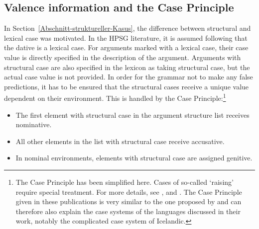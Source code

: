 \subsection{Valence information and the Case Principle}

\addlines[2]
In Section~\ref{Abschnitt-struktureller-Kasus}, the difference between structural
and lexical case was motivated. In the HPSG literature, it is assumed following \citet{Haider86}
that the dative is a lexical case. For arguments marked with a lexical case, their case value is
directly specified in the description of the argument. Arguments with structural case are also
specified in the lexicon as taking structural case, but the actual case value is not provided. In
order for the grammar not to make any false predictions, it has to be ensured that the structural
cases receive a unique value dependent on their 
environment. This is handled by the Case Principle:\footnote{%
	The Case Principle has been simplified here. Cases of so-called `raising' require special treatment.
	For more details, see ,  and . The Case Principle given in these publications is very similar to the one proposed by \citet*{YMJ87}
	and can therefore also explain the case systems of the languages discussed in their work, notably the complicated
	case system of Icelandic.
}
\begin{principle-break}
\label{case-p}
\begin{itemize}
\item The first element with structural case in the argument structure list receives nominative.
\item All other elements in the list with structural case receive accusative.
\item In nominal environments, elements with structural case are assigned genitive.
\end{itemize}
\end{principle-break}

